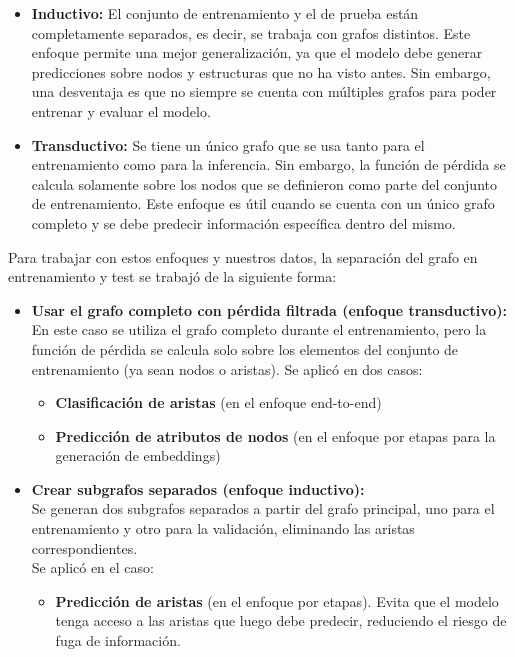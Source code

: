 
\begin{itemize}
    \item \textbf{Inductivo:} El conjunto de entrenamiento y el de prueba están completamente separados, es decir, se trabaja con grafos distintos. Este enfoque permite una mejor generalización, ya que el modelo debe generar predicciones sobre nodos y estructuras que no ha visto antes. Sin embargo, una desventaja es que no siempre se cuenta con múltiples grafos para poder entrenar y evaluar el modelo.
    
    \item \textbf{Transductivo:} Se tiene un único grafo que se usa tanto para el entrenamiento como para la inferencia. Sin embargo, la función de pérdida se calcula solamente sobre los nodos que se definieron como parte del conjunto de entrenamiento. Este enfoque es útil cuando se cuenta con un único grafo completo y se debe predecir información específica dentro del mismo.\\
    
\end{itemize}

Para trabajar con estos enfoques y nuestros datos, la separación del grafo en entrenamiento y test se trabajó de la siguiente forma:

\begin{itemize}

    \item \textbf{Usar el grafo completo con pérdida filtrada (enfoque transductivo):} \\
    En este caso se utiliza el grafo completo durante el entrenamiento, pero la función de pérdida se calcula solo sobre los elementos del conjunto de entrenamiento (ya sean nodos o aristas).
    Se aplicó en dos casos:
    \begin{itemize}
        \item \textbf{Clasificación de aristas} (en el enfoque end-to-end)
        \item \textbf{Predicción de atributos de nodos} (en el enfoque por etapas para la generación de embeddings)
    \end{itemize}
    
    \item \textbf{Crear subgrafos separados (enfoque inductivo):} \\
    Se generan dos subgrafos separados a partir del grafo principal, uno para el entrenamiento y otro para la validación, eliminando las aristas correspondientes.\\
    Se aplicó en el caso:
    \begin{itemize}
        \item \textbf{Predicción de aristas} (en el enfoque por etapas). Evita que el modelo tenga acceso a las aristas que luego debe predecir, reduciendo el riesgo de fuga de información.
    \end{itemize}
\end{itemize}


